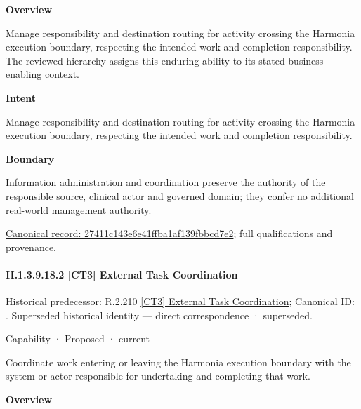 \textbf{Overview}



Manage responsibility and destination routing for activity crossing the Harmonia execution boundary, respecting the intended work and completion responsibility. The reviewed hierarchy assigns this enduring ability to its stated business-enabling context.



\textbf{Intent}



Manage responsibility and destination routing for activity crossing the Harmonia execution boundary, respecting the intended work and completion responsibility.



\textbf{Boundary}



Information administration and coordination preserve the authority of the responsible source, clinical actor and governed domain; they confer no additional real-world management authority.


{\footnotesize \href{../../../../../../../continuum/strategy/capability/27411c143e6e41ffba1af139fbbcd7e2.md}{Canonical record: 27411c143e6e41ffba1af139fbbcd7e2}; full qualifications and provenance.}\par
\paragraph*{II.1.3.9.18.2 [CT3] External Task Coordination}
\label{navigation:II.1.3.9.18.2}

{\small Historical predecessor: R.2.210 \hyperref[element:32be309d65594592bac4d7b068def0d2]{[CT3] External Task Coordination}; Canonical ID: \texttt{}. Superseded historical identity — direct correspondence · superseded.}\par
\label{element:ff3447c929724245a13ee864874b5561}
{\small Capability · Proposed · current}\par

Coordinate work entering or leaving the Harmonia execution boundary with the system or actor responsible for undertaking and completing that work.



\textbf{Overview}



